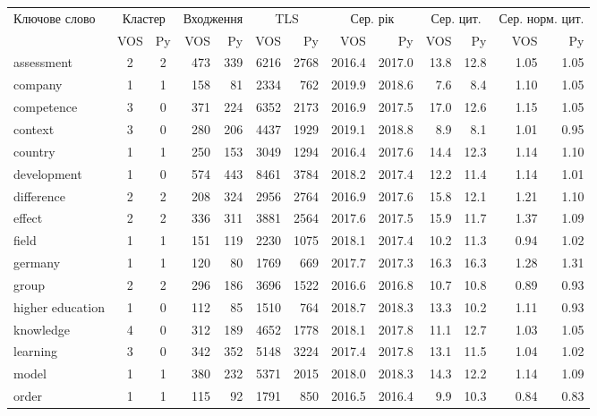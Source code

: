 \begin{tabular}{l|cc|rr|rr|rr|rr|rr}
\hline
Ключове слово & \multicolumn{2}{c|}{Кластер} & \multicolumn{2}{c|}{Входження} & \multicolumn{2}{c|}{TLS} & \multicolumn{2}{c|}{Сер. рік} & \multicolumn{2}{c|}{Сер. цит.} & \multicolumn{2}{c}{Сер. норм. цит.} \\
 & VOS & Py & VOS & Py & VOS & Py & VOS & Py & VOS & Py & VOS & Py \\
\hline
assessment & 2 & 2 & 473 & 339 & 6216 & 2768 & 2016.4 & 2017.0 & 13.8 & 12.8 & 1.05 & 1.05 \\
company & 1 & 1 & 158 & 81 & 2334 & 762 & 2019.9 & 2018.6 & 7.6 & 8.4 & 1.10 & 1.05 \\
competence & 3 & 0 & 371 & 224 & 6352 & 2173 & 2016.9 & 2017.5 & 17.0 & 12.6 & 1.15 & 1.05 \\
context & 3 & 0 & 280 & 206 & 4437 & 1929 & 2019.1 & 2018.8 & 8.9 & 8.1 & 1.01 & 0.95 \\
country & 1 & 1 & 250 & 153 & 3049 & 1294 & 2016.4 & 2017.6 & 14.4 & 12.3 & 1.14 & 1.10 \\
development & 1 & 0 & 574 & 443 & 8461 & 3784 & 2018.2 & 2017.4 & 12.2 & 11.4 & 1.14 & 1.01 \\
difference & 2 & 2 & 208 & 324 & 2956 & 2764 & 2016.9 & 2017.6 & 15.8 & 12.1 & 1.21 & 1.10 \\
effect & 2 & 2 & 336 & 311 & 3881 & 2564 & 2017.6 & 2017.5 & 15.9 & 11.7 & 1.37 & 1.09 \\
field & 1 & 1 & 151 & 119 & 2230 & 1075 & 2018.1 & 2017.4 & 10.2 & 11.3 & 0.94 & 1.02 \\
germany & 1 & 1 & 120 & 80 & 1769 & 669 & 2017.7 & 2017.3 & 16.3 & 16.3 & 1.28 & 1.31 \\
group & 2 & 2 & 296 & 186 & 3696 & 1522 & 2016.6 & 2016.8 & 10.7 & 10.8 & 0.89 & 0.93 \\
higher education & 1 & 0 & 112 & 85 & 1510 & 764 & 2018.7 & 2018.3 & 13.3 & 10.2 & 1.11 & 0.93 \\
knowledge & 4 & 0 & 312 & 189 & 4652 & 1778 & 2018.1 & 2017.8 & 11.1 & 12.7 & 1.03 & 1.05 \\
learning & 3 & 0 & 342 & 352 & 5148 & 3224 & 2017.4 & 2017.8 & 13.1 & 11.5 & 1.04 & 1.02 \\
model & 1 & 1 & 380 & 232 & 5371 & 2015 & 2018.0 & 2018.3 & 14.3 & 12.2 & 1.14 & 1.09 \\
order & 1 & 1 & 115 & 92 & 1791 & 850 & 2016.5 & 2016.4 & 9.9 & 10.3 & 0.84 & 0.83 \\

\end{tabular}
